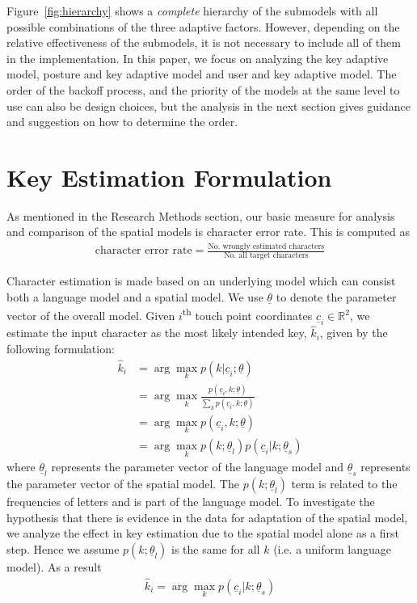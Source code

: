 \documentclass{sigchi}
\begin{document}
Figure~\ref{fig:hierarchy} shows a \textit{complete} hierarchy of the submodels with all
possible combinations of the three adaptive factors. However, depending on the
relative effectiveness of the submodels, it is not necessary to include all of
them in the implementation. In this paper, we focus on analyzing the key
adaptive model, posture and key adaptive model and user and key adaptive model.
The order of the
backoff process, and the priority of the models at the same level to use can
also be design choices, but the analysis in the next section gives
guidance and suggestion on how to determine the order.

\section{Key Estimation Formulation}\label{sec:formulation}
As mentioned in the Research Methods section, our basic measure for analysis and comparison of the spatial models is character error rate. This is computed as
\begin{align}
\text{character error rate} = \frac{\text{No. wrongly estimated characters}}{\text{No. all target characters}}
\end{align}

Character estimation is made based on an underlying model which can consist
both a language model and a spatial model.
We use $\underline\theta$ to denote the parameter vector of the overall model. Given
$i$\textsuperscript{th} touch point coordinates $\underline c_i \in \mathbb{R}^2$, we estimate the input character as the most likely intended key, $\hat k_i$,  given by the following formulation:
\begin{align}
\hat k_i &= \arg\max_k p(k | \underline c_i; \underline \theta) \\
          &= \arg\max_k \frac{p(\underline c_i, k; \underline \theta)}{\sum_k p(\underline c_i, k; \underline \theta)} \\
          &= \arg\max_k p(\underline c_i, k; \underline \theta) \\
          &= \arg\max_k p(k;\underline\theta_l)p(\underline c_i | k; \underline \theta_s) \label{eq:likely-k}
\end{align}
where $\underline\theta_l$ represents the parameter vector of the language model and $\underline\theta_s$ represents the parameter vector of the spatial model. The $p(k;\underline\theta_l)$ term is related to the frequencies of letters and is part of the language model. To investigate the hypothesis that there is evidence in the data for adaptation of the spatial model, we analyze the effect in key estimation due to the spatial model alone as a first step. Hence we assume $p(k; \underline\theta_l)$ is the same for all $k$ (i.e. a uniform language model). As a result
\begin{align}
\hat k_i = \arg\max_k p(\underline c_i | k; \underline \theta_s)
\end{align}
\end{document}
